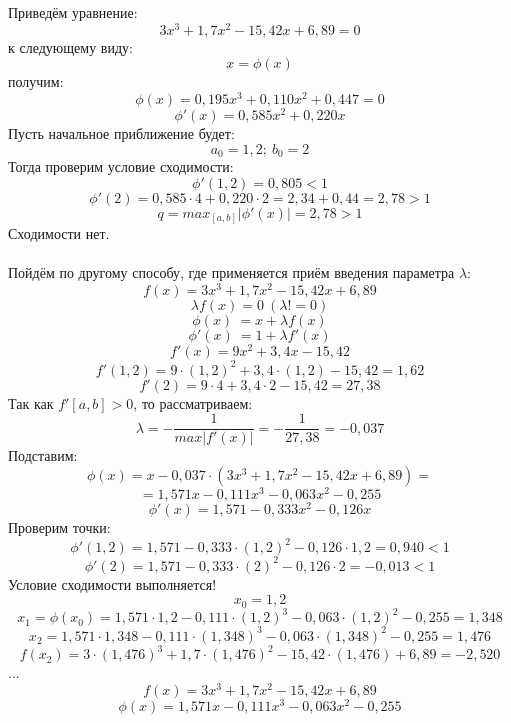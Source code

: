 \documentclass{article}
\begin{document}
Приведём уравнение:
\[
    3x^3+1,7x^2-15,42x+6,89 = 0 \]
к следующему виду:
\[x = \phi (x)\]
получим:
\[
    \phi (x) = 0,195x^3+0,110x^2+0,447 = 0 \]
    \[
    \phi' (x) = 0,585x^2+0,220x \]
Пусть начальное приближение будет:
\[
    a_0 = 1,2;\ b_0 = 2\]
Тогда проверим условие сходимости:
\[
    \phi' (1,2) = 0,805 < 1 \]
    \[
    \phi' (2) = 0,585\cdot 4+0,220\cdot 2 = 2,34+0,44 = 2,78 > 1 \]
\[
    q = max_{[a,b]}|\phi'(x)| = 2,78 > 1
\]
Сходимости нет.
\\ \\
Пойдём по другому способу, где применяется приём введения параметра $\lambda$:
\[
    f(x) = 3x^3+1,7x^2-15,42x+6,89 \]
\[\lambda f(x) = 0\ (\lambda!=0)\]
\[\phi(x)\ = x+ \lambda f(x) \]
\[\phi'(x)\ = 1+ \lambda f'(x) \]
\[f'(x) = 9x^2 +3,4x - 15,42\]
\[f'(1,2) = 9\cdot (1,2)^2 +3,4\cdot (1,2) - 15,42 = 1,62\]
\[f'(2) = 9\cdot 4 +3,4\cdot 2 - 15,42 = 27,38\]
Так как $f'[a, b] > 0$, то рассматриваем:
\[
    \lambda = - \frac{1}{max|f'(x)|} = -\frac{1}{27,38} = -0,037\] 
Подставим:
\[\phi(x) = x -0,037 \cdot (3x^3+1,7x^2-15,42x+6,89)= \] 
\[= 1,571x - 0,111x^3 - 0,063x^2 - 0,255\]
\[\phi'(x) = 1,571 - 0,333 x^2 - 0,126x\]
Проверим точки:
\[\phi'(1,2) = 1,571 - 0,333\cdot(1,2)^2 - 0,126\cdot 1,2 = 0,940 < 1\]
\[\phi'(2) = 1,571 - 0,333\cdot(2)^2 - 0,126\cdot 2 = -0,013 < 1\]
Условие сходимости выполняется!
\[x_0 = 1,2 \]
\[x_1 = \phi(x_0) = 1,571\cdot 1,2 - 0,111\cdot(1,2)^3 - 0,063\cdot(1,2)^2 - 0,255 = 1,348\]
\[x_2 = 1,571\cdot 1,348 - 0,111\cdot(1,348)^3 - 0,063\cdot(1,348)^2 - 0,255 = 1,476\] 
\[f(x_2) = 3\cdot (1,476)^3+1,7\cdot (1,476)^2-15,42\cdot (1,476)+6,89 = -2,520\]
...
\[
    f(x) = 3x^3+1,7x^2-15,42x+6,89 \]
\[\phi(x)= 1,571x - 0,111x^3 - 0,063x^2 - 0,255\]
\end{document}
